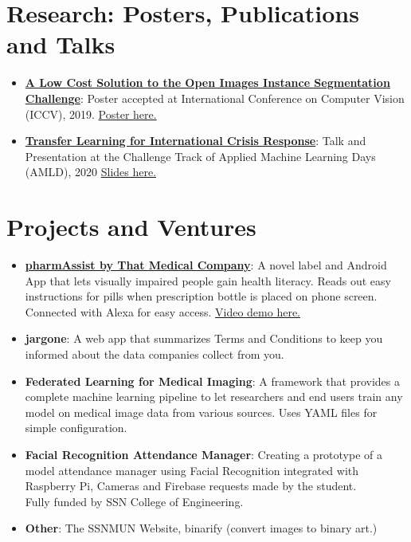 \documentclass[letterpaper,11pt]{article}
\newcommand{\resumeItem}[2]{
  \item\small{
    \textbf{#1}{: #2 \vspace{-2pt}}
  }
}
\newcommand{\resumeSubItem}[2]{\resumeItem{#1}{#2}\vspace{-4pt}}
\newcommand{\resumeSubHeadingListStart}{\begin{itemize}[leftmargin=*]}
\newcommand{\resumeSubHeadingListEnd}{\end{itemize}}
\begin{document}
\section{Research: Posters, Publications and Talks}
  \resumeSubHeadingListStart
    \resumeSubItem
      {\href{https://bit.ly/OpenImagesPoster2019}{A Low Cost Solution to the Open Images Instance Segmentation Challenge}}{Poster accepted at International Conference on Computer Vision (ICCV), 2019. \href{https://bit.ly/OpenImagesPoster2019}{Poster here.}}
       \resumeSubItem
      {\href{https://bit.ly/AMLDPresentationDEEP}{Transfer Learning for International Crisis Response}}{Talk and Presentation at the Challenge Track of Applied Machine Learning Days (AMLD), 2020 \href{https://bit.ly/AMLDPresentationDEEP}{Slides here.} }
  \resumeSubHeadingListEnd
\section{Projects and Ventures}
 \resumeSubHeadingListStart
  	\resumeSubItem{\href{https://bit.ly/PharmAssistDemo}{pharmAssist by That Medical Company}}
      {A novel label and Android App that lets visually impaired people gain health literacy. Reads out easy instructions for pills when prescription bottle is placed on phone screen. Connected with Alexa for easy access. \href{https://bit.ly/PharmAssistDemo}{Video demo here.}}
    \resumeSubItem{jargone}
      {A web app that summarizes Terms and Conditions to keep you informed about the data companies collect from you.}
      
    \resumeSubItem{Federated Learning for Medical Imaging}
      {A framework that provides a complete machine learning pipeline to let researchers and end users train any model on medical image data from various sources. Uses YAML files for simple configuration.}
  
    \resumeSubItem{Facial Recognition Attendance Manager}
      {Creating a prototype of a model attendance manager using Facial Recognition integrated with Raspberry Pi, Cameras and Firebase requests made by the student. \\Fully funded by SSN College of Engineering.}
\iffalse
    \resumeSubItem{Calmity}
      {An app that helps victims of a disaster find food, transport and shelter in nearby places and allows them to make SOS calls. Further, allows able users to finding NGOs that they can volunteer at and post about any amenities that they have to offer.}
    \resumeSubItem{trashify}
      {Android Application that uses Deep Learning and TensorFlowLite to classify your trash into 3 categories.\\Prototype of model using Raspberry Pi in implementation phase.}
\fi
    \resumeSubItem{Other}
      {The SSNMUN Website, binarify (convert images to binary art.)}
  \resumeSubHeadingListEnd
\end{document}
